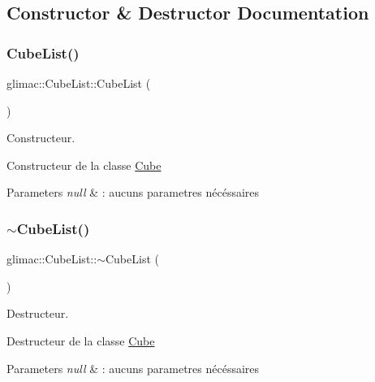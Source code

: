 \subsection{Constructor \& Destructor Documentation}
\mbox{\label{classglimac_1_1CubeList_a27f9622967bd19bcb34b3095fbb55ff6}} 
\subsubsection{\texorpdfstring{Cube\+List()}{CubeList()}}
{\footnotesize\ttfamily glimac\+::\+Cube\+List\+::\+Cube\+List (\begin{DoxyParamCaption}{ }\end{DoxyParamCaption})}



Constructeur. 

Constructeur de la classe \hyperlink{classglimac_1_1Cube}{Cube}


\begin{DoxyParams}{Parameters}
{\em null} & \+: aucuns parametres nécéssaires \\
\hline
\end{DoxyParams}
\mbox{\label{classglimac_1_1CubeList_aca9014a89b4f853e301a2821b6d881d9}} 
\subsubsection{\texorpdfstring{$\sim$\+Cube\+List()}{~CubeList()}}
{\footnotesize\ttfamily glimac\+::\+Cube\+List\+::$\sim$\+Cube\+List (\begin{DoxyParamCaption}{ }\end{DoxyParamCaption})}



Destructeur. 

Destructeur de la classe \hyperlink{classglimac_1_1Cube}{Cube}


\begin{DoxyParams}{Parameters}
{\em null} & \+: aucuns parametres nécéssaires \\
\hline
\end{DoxyParams}


